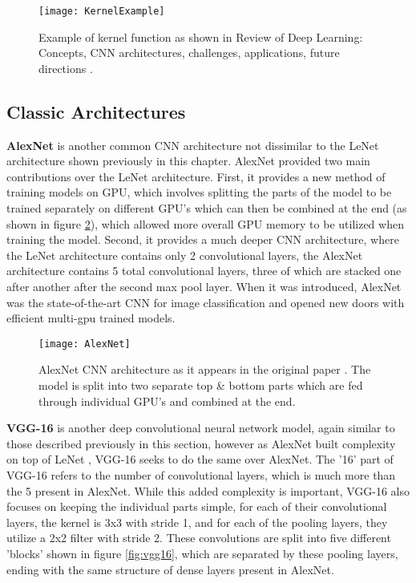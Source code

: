 \begin{figure}[ht]
	\texttt{[image: KernelExample]}
	\centering
	\caption{Example of kernel function as shown in Review of Deep Learning: Concepts, CNN architectures, challenges, applications, future directions \cite{2021cnnreview}.}
	\label{fig:kernel-example}
\end{figure}

\subsection{Classic Architectures}
\label{sec:classic-cnn}

\textbf{AlexNet} \cite{alexnet} is another common CNN architecture not dissimilar to the LeNet architecture \cite{lenet5} shown previously in this chapter. AlexNet provided two main contributions over the LeNet architecture. First, it provides a new method of training models on GPU, which involves splitting the parts of the model to be trained separately on different GPU's which can then be combined at the end (as shown in figure \ref{fig:alexnet}), which allowed more overall GPU memory to be utilized when training the model. Second, it provides a much deeper CNN architecture, where the LeNet architecture contains only 2 convolutional layers, the AlexNet architecture contains 5 total convolutional layers, three of which are stacked one after another after the second max pool layer. When it was introduced, AlexNet was the state-of-the-art CNN for image classification and opened new doors with efficient multi-gpu trained models.

\begin{figure}[ht]
	\texttt{[image: AlexNet]}
	\centering
	\caption{AlexNet \cite{alexnet} CNN architecture as it appears in the original paper \cite{alexnet}. The model is split into two separate top \& bottom parts which are fed through individual GPU's and combined at the end.}
	\label{fig:alexnet}
\end{figure}

\textbf{VGG-16} \cite{vgg16} is another deep convolutional neural network model, again similar to those described previously in this section, however as AlexNet \cite{alexnet} built complexity on top of LeNet \cite{lenet5}, VGG-16 seeks to do the same over AlexNet. The '16' part of VGG-16 refers to the number of convolutional layers, which is much more than the 5 present in AlexNet. While this added complexity is important, VGG-16 also focuses on keeping the individual parts simple, for each of their convolutional layers, the kernel is 3x3 with stride 1, and for each of the pooling layers, they utilize a 2x2 filter with stride 2. These convolutions are split into five different 'blocks' shown in figure \ref{fig:vgg16}, which are separated by these pooling layers, ending with the same structure of dense layers present in AlexNet.

